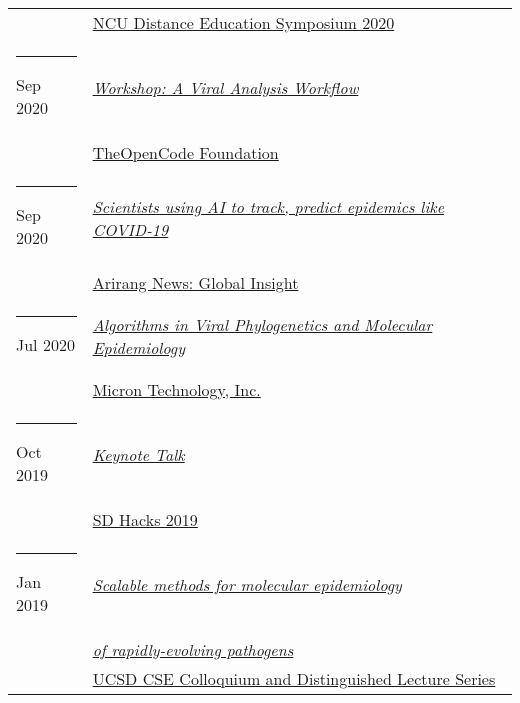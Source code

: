 \documentclass[margin,line]{res}
\begin{document}
\begin{resume}
\begin{longtable}{@{}p{0.7in}p{4in}}
\hspace*{-4mm} & \hspace{4mm} \href{http://distance.ncu.edu.jm/proposal_submission}{NCU Distance Education Symposium 2020}\\
\hspace*{-4mm} \rule{-1mm}{5mm} Sep 2020 & \href{https://www.theopencode.org/a-viral-analysis-workflow/}{\textit{Workshop: A Viral Analysis Workflow}}\\*
\hspace*{-4mm} & \hspace{4mm} \href{https://www.theopencode.org/}{TheOpenCode Foundation}\\
\hspace*{-4mm} \rule{-1mm}{5mm} Sep 2020 & \href{https://youtu.be/xHSFWtLL8bc}{\textit{Scientists using AI to track, predict epidemics like COVID-19}}\\*
\hspace*{-4mm} & \hspace{4mm} \href{https://www.arirang.com/}{Arirang News: Global Insight}\\
\hspace*{-4mm} \rule{-1mm}{5mm} Jul 2020 & \href{https://www.micron.com/}{\textit{Algorithms in Viral Phylogenetics and Molecular Epidemiology}}\\*
\hspace*{-4mm} & \hspace{4mm} \href{https://www.micron.com/}{Micron Technology, Inc.}\\
\hspace*{-4mm} \rule{-1mm}{5mm} Oct 2019 & \href{https://www.sdhacks.io/}{\textit{Keynote Talk}}\\*
\hspace*{-4mm} & \hspace{4mm} \href{https://www.sdhacks.io/}{SD Hacks 2019}\\
\hspace*{-4mm} \rule{-1mm}{5mm} Jan 2019 & \href{https://cse.ucsd.edu/about/scalable-methods-molecular-epidemiology-rapidly-evolving-pathogens}{\textit{Scalable methods for molecular epidemiology}}\\*
\hspace*{-4mm} & \hspace{4mm} \href{https://cse.ucsd.edu/about/scalable-methods-molecular-epidemiology-rapidly-evolving-pathogens}{\textit{of rapidly-evolving pathogens}}\\*
\hspace*{-4mm} & \hspace{4mm} \href{https://cse.ucsd.edu/about/cse-colloquium-dls/2018-2019}{UCSD CSE Colloquium and Distinguished Lecture Series}\\

\end{longtable}
\end{resume}
\end{document}
